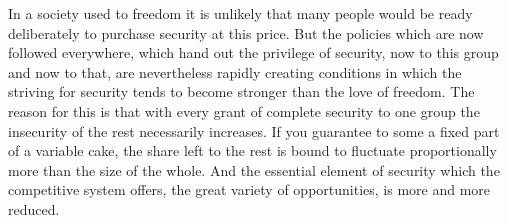 \documentclass[11pt,openany]{book}
\begin{document}
\begin{center}\textasteriskcentered\hspace{0.9em}\textasteriskcentered\hspace{0.9em}\textasteriskcentered\end{center}

\begin{center}\textasteriskcentered\hspace{0.9em}\textasteriskcentered\hspace{0.9em}\textasteriskcentered\end{center}

\begin{center}\textasteriskcentered\hspace{0.9em}\textasteriskcentered\hspace{0.9em}\textasteriskcentered\end{center}

\begin{center}\textasteriskcentered\hspace{0.9em}\textasteriskcentered\hspace{0.9em}\textasteriskcentered\end{center}

\begin{center}\textasteriskcentered\hspace{0.9em}\textasteriskcentered\hspace{0.9em}\textasteriskcentered\end{center}

In a society used to freedom it is unlikely that many people would be ready deliberately to purchase security at this price. But the policies which are now followed everywhere, which hand out the privilege of security, now to this group and now to that, are nevertheless rapidly creating conditions in which the striving for security tends to become stronger than the love of freedom. The reason for this is that with every grant of complete security to one group the insecurity of the rest necessarily increases. If you guarantee to some a fixed part of a variable cake, the share left to the rest is bound to fluctuate proportionally more than the size of the whole. And the essential element of security which the competitive system offers, the great variety of opportunities, is more and more reduced.
\end{document}
